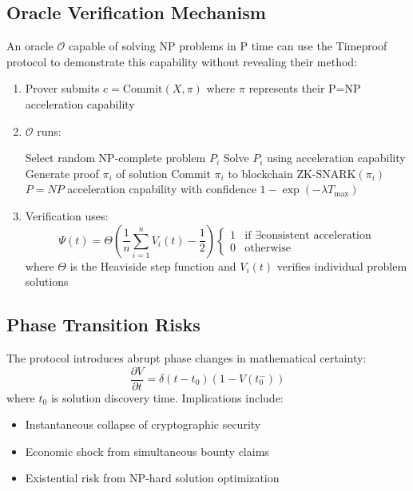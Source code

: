 \documentclass[12pt]{report}
\begin{document}
\subsection{Oracle Verification Mechanism}
An oracle $\mathcal{O}$ capable of solving NP problems in P time can use the Timeproof protocol to demonstrate this capability without revealing their method:
\begin{enumerate}
    \item Prover submits $c = \text{Commit}(X, \pi)$ where $\pi$ represents their P=NP acceleration capability
    \item $\mathcal{O}$ runs:
    \begin{algorithmic}[1]
            \State Select random NP-complete problem $P_i$
            \State Solve $P_i$ using acceleration capability
            \State Generate proof $\pi_i$ of solution
            \State Commit $\pi_i$ to blockchain
            \State \Return $\text{ZK-SNARK}(\pi_i)$ 
        \EndWhile
        \State \Return $P = NP$ acceleration capability with confidence $1-\exp(-\lambda T_{\text{max}})$
    \end{algorithmic}
    \item Verification uses:
    \begin{equation}
        \Psi(t) = \Theta\left(\frac{1}{n}\sum_{i=1}^n V_i(t) - \frac{1}{2}\right)\begin{cases}
            1 & \text{if } \exists \text{consistent acceleration} \\
            0 & \text{otherwise}
        \end{cases}
    \end{equation}
    where $\Theta$ is the Heaviside step function and $V_i(t)$ verifies individual problem solutions
\end{enumerate}

\subsection{Phase Transition Risks}
The protocol introduces abrupt phase changes in mathematical certainty:
\begin{equation}
    \frac{\partial V}{\partial t} = \delta(t-t_0)(1 - V(t_0^-))
\end{equation}
where $t_0$ is solution discovery time. Implications include:
\begin{itemize}
    \item Instantaneous collapse of cryptographic security
    \item Economic shock from simultaneous bounty claims
    \item Existential risk from NP-hard solution optimization
\end{itemize}
\end{document}
